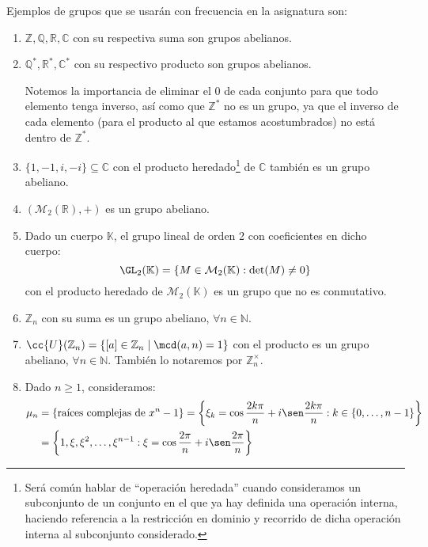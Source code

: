 \begin{ejemplo} Ejemplos de grupos que se usarán con frecuencia en la asignatura son:
     \begin{enumerate}
         \item $\mathbb{Z},\mathbb{Q},\mathbb{R},\mathbb{C}$ con su respectiva suma son grupos abelianos.
         \item $\mathbb{Q}^\ast,\mathbb{R}^\ast,\mathbb{C}^\ast$ con su respectivo producto son grupos abelianos.

             Notemos la importancia de eliminar el $0$ de cada conjunto para que todo elemento tenga inverso, así como que $\mathbb{Z}^\ast$ no es un grupo, ya que el inverso de cada elemento (para el producto al que estamos acostumbrados) no está dentro de $\mathbb{Z}^\ast$.
         \item $\{1,-1,i,-i\}\subseteq \mathbb{C}$ con el producto heredado\footnote{Será común hablar de ``operación heredada'' cuando consideramos un subconjunto de un conjunto en el que ya hay definida una operación interna, haciendo referencia a la restricción en dominio y recorrido de dicha operación interna al subconjunto considerado.} de $\mathbb{C}$ también es un grupo abeliano.
         \item $(\mathcal{M}_2(\mathbb{R}),+)$ es un grupo abeliano.
         \item Dado un cuerpo $\mathbb{K}$, el grupo lineal de orden 2 con coeficientes en dicho cuerpo:
             \begin{equation*}
                 \GL_2(\mathbb{K}) = \{M\in \mathcal{M}_2(\mathbb{K}) : \det(M)\neq 0\}
             \end{equation*}
             con el producto heredado de $\mathcal{M}_2(\mathbb{K})$ es un grupo que no es conmutativo.
         \item $\mathbb{Z}_n$ con su suma es un grupo abeliano, $\forall n\in \mathbb{N}$.
         \item $\cc{U}(\mathbb{Z}_n)=\{[a]\in \mathbb{Z}_n \mid \mcd(a,n)=1\}$ con el producto es un grupo abeliano, $\forall n\in \mathbb{N}$. También lo notaremos por $\mathbb{Z}_n^\times$.
         \item Dado $n\geq 1$, consideramos:
             \begin{align*}
                 \mu_n &= \{\text{raíces complejas de\ } x^n-1\} = \left\{\xi_k = \cos\frac{2k\pi}{n} + i\sen\frac{2k\pi}{n} : k\in \{0,\dots,n-1\}\right\} \\
                       &= \left\{1,\xi,\xi^2, \ldots, \xi^{n-1} : \xi = \cos\frac{2\pi}{n} + i\sen\frac{2\pi}{n}\right\}

\end{align*}
\end{enumerate}
\end{ejemplo}
